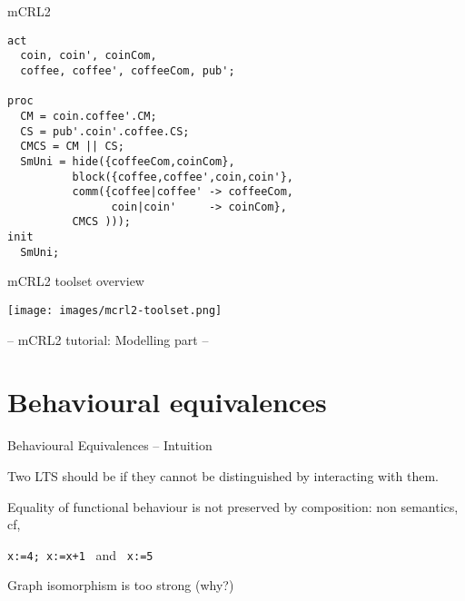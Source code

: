 \documentclass{beamer}
\begin{document}
\begin{frame}[fragile]{mCRL2}
\small
  

\begin{lstlisting}
act
  coin, coin', coinCom,
  coffee, coffee', coffeeCom, pub';

proc
  CM = coin.coffee'.CM;
  CS = pub'.coin'.coffee.CS;
  CMCS = CM || CS;
  SmUni = hide({coffeeCom,coinCom},
          block({coffee,coffee',coin,coin'},
          comm({coffee|coffee' -> coffeeCom,
                coin|coin'     -> coinCom},
          CMCS )));
init
  SmUni;
\end{lstlisting}
\end{frame}

\begin{slide}{mCRL2 toolset overview}
  \centering
  
  \texttt{[image: images/mcrl2-toolset.png]}

  -- mCRL2 tutorial: Modelling part --
\end{slide}

\section{Behavioural equivalences}

\begin{slide}{Behavioural Equivalences -- Intuition}
\small


Two LTS should be  if they cannot be distinguished by interacting with them.


\begin{block}{Equality of functional behaviour}
is not preserved by  composition: non  semantics, cf,
\begin{center}
\texttt{x:=4; x:=x+1} ~and~ \texttt{x:=5}
\end{center}
\end{block}

\begin{block}{Graph isomorphism} 
is too strong (why?)
\end{block}

\end{slide}
\end{document}

